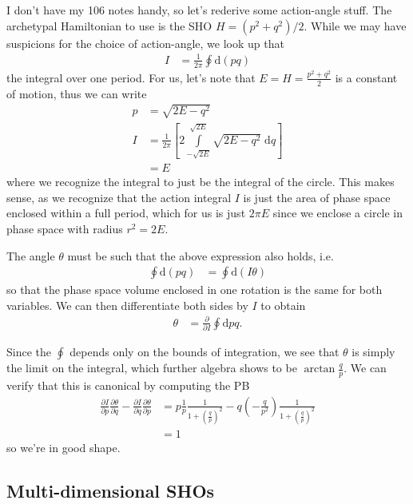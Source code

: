 \documentclass[10pt]{article}
\newcommand{\pd}[2]{\frac{\partial#1}{\partial#2}}
\begin{document}
I don't have my 106 notes handy, so let's rederive some action-angle stuff. The
archetypal Hamiltonian to use is the SHO $H = (p^2 + q^2)/2$. While we may have
suspicions for the choice of action-angle, we look up that
\begin{align}
    I &= \frac{1}{2\pi}\oint \mathrm{d}(pq)
\end{align}
the integral over one period. For us, let's note that
$E = H = \frac{p^2 + q^2}{2}$
is a constant of motion, thus we can write
\begin{align}
    p &= \sqrt{2E - q^2}\\
    I &= \frac{1}{2\pi} \left[ 2 \int\limits_{-\sqrt{2E}}^{\sqrt{2E}}
        \sqrt{2E - q^2}\;\mathrm{d}q \right]\\
    &= E
\end{align}
where we recognize the integral to just be the integral of the circle. This
makes sense, as we recognize that the action integral $I$ is just the area of
phase space enclosed within a full period, which for us is just $2\pi E$ since
we enclose a circle in phase space with radius $r^2 = 2E$.

The angle $\theta$ must be such that the above expression also holds, i.e.
\begin{align}
    \oint \mathrm{d}(pq) &= \oint \mathrm{d}(I\theta)
\end{align}
so that the phase space volume enclosed in one rotation is the same for both
variables. We can then differentiate both sides by $I$ to obtain
\begin{align}
    \theta &= \pd{}{I}\oint \mathrm{d}pq.
\end{align}

Since the $\oint$ depends only on the bounds of integration, we see that
$\theta$ is simply the limit on the integral, which further algebra shows to be
$\arctan \frac{q}{p}$. We can verify that this is canonical by computing the PB
\begin{align}
    \pd{I}{p}\pd{\theta}{q} - \pd{I}{q}\pd{\theta}{p} &=
        p \frac{1}{p}\frac{1}{1 + \left( \frac{q}{p} \right)^2} -
        q \left( - \frac{q}{p^2} \right)
        \frac{1}{1 + \left( \frac{q}{p} \right)^2}\\
    &= 1
\end{align}
so we're in good shape.

\subsection{Multi-dimensional SHOs}
\end{document}
